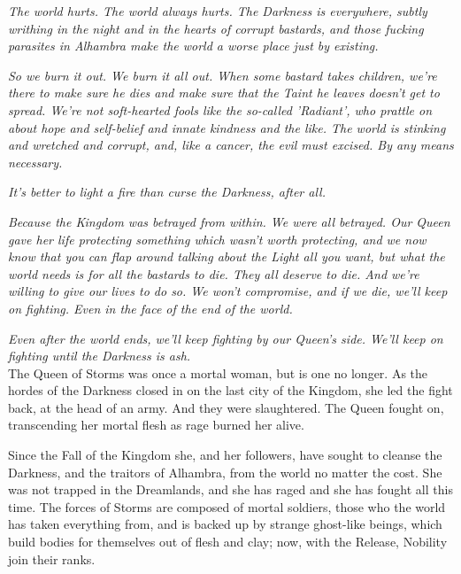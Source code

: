 \newpage{}

\noindent\textit{The world hurts. The world always hurts. The Darkness is everywhere, subtly writhing in the night and in the hearts of corrupt bastards, and those fucking parasites in Alhambra make the world a worse place just by existing. }

\textit{So we burn it out. We burn it all out. When some bastard takes children, we're there to make sure he dies and make sure that the Taint he leaves doesn't get to spread. We're not soft-hearted fools like the so-called 'Radiant', who prattle on about hope and self-belief and innate kindness and the like. The world is stinking and wretched and corrupt, and, like a cancer, the evil must excised. By any means necessary. }

\textit{It's better to light a fire than curse the Darkness, after all.}

\textit{Because the Kingdom was betrayed from within. We were all betrayed. Our Queen gave her life protecting something which wasn't worth protecting, and we now know that you can flap around talking about the Light all you want, but what the world needs is for all the bastards to die. They all deserve to die. And we're willing to give our lives to do so. We won't compromise, and if we die, we'll keep on fighting. Even in the face of the end of the world.}

\textit{Even after the world ends, we'll keep fighting by our Queen's side. We'll keep on fighting until the Darkness is ash.}\\

\noindent The Queen of Storms was once a mortal woman, but is one no longer. As the hordes of the Darkness closed in on the last city of the Kingdom, she led the fight back, at the head of an army. And they were slaughtered. The Queen fought on, transcending her mortal flesh as rage burned her alive. 

Since the Fall of the Kingdom she, and her followers, have sought to cleanse the Darkness, and the traitors of Alhambra, from the world no matter the cost. She was not trapped in the Dreamlands, and she has raged and she has fought all this time. The forces of Storms are composed of mortal soldiers, those who the world has taken everything from, and is backed up by strange ghost-like beings, which build bodies for themselves out of flesh and clay; now, with the Release, Nobility join their ranks. 

